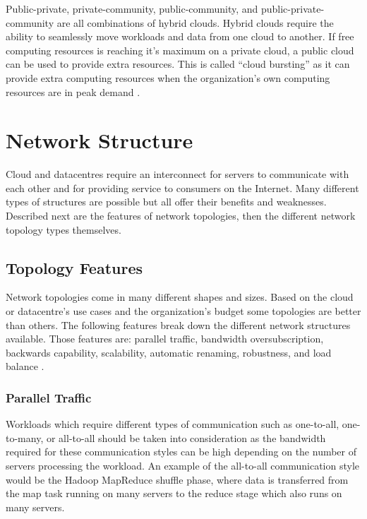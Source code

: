 \documentclass[12pt]{article}
\begin{document}
Public-private, private-community, public-community, and public-private-community are all combinations of hybrid clouds. Hybrid clouds require the ability to seamlessly move workloads and data from one cloud to another. If free computing resources is reaching it's maximum on a private cloud, a public cloud can be used to provide extra resources. This is called ``cloud bursting'' as it can provide extra computing resources when the organization's own computing resources are in peak demand \cite{dillon2010cloud}.




\section{Network Structure} \label{sec:network-structure}

Cloud and datacentres require an interconnect for servers to communicate with each other and for providing service to consumers on the Internet. Many different types of structures are possible but all offer their benefits and weaknesses. Described next are the features of network topologies, then the different network topology types themselves.


\subsection{Topology Features} \label{sub:topology-features}

Network topologies come in many different shapes and sizes. Based on the cloud or datacentre's use cases and the organization's budget some topologies are better than others. The following features break down the different network structures available. Those features are: parallel traffic, bandwidth oversubscription, backwards capability, scalability, automatic renaming, robustness, and load balance \cite{wang2015survey}.


\subsubsection{Parallel Traffic} \label{ssub:parallel-traffic}

Workloads which require different types of communication such as one-to-all, one-to-many, or all-to-all should be taken into consideration as the bandwidth required for these communication styles can be high depending on the number of servers processing the workload. An example of the all-to-all communication style would be the Hadoop MapReduce shuffle phase, where data is transferred from the map task running on many servers to the reduce stage which also runs on many servers.
\end{document}

